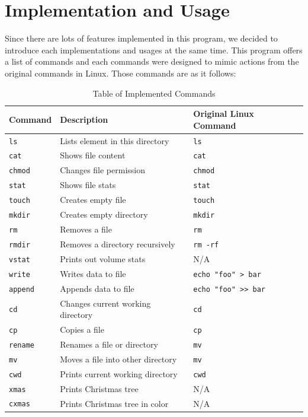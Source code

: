 \documentclass{homework}
\begin{document}
\section{Implementation and Usage}
Since there are lots of features implemented in this program, we decided to introduce each implementations and usages at the same time. This program offers a list of commands and each commands were designed to mimic actions from the original commands in Linux. Those commands are as it follows:

\begin{center}
\begin{table}[h]
\begin{tabularx}{1.0\textwidth} { 
  | >{\centering\arraybackslash}X 
  | >{\centering\arraybackslash}X 
  | >{\centering\arraybackslash}X | }
 \hline
 \textbf{Command} & \textbf{Description} & \textbf{Original Linux Command}\\
 \hline
 \texttt{ls} & Lists element in this directory & \texttt{ls}\\
  \hline
 \texttt{cat} & Shows file content & \texttt{cat}\\
  \hline
 \texttt{chmod} & Changes file permission & \texttt{chmod}\\
  \hline
 \texttt{stat} & Shows file stats & \texttt{stat}\\
  \hline
 \texttt{touch} & Creates empty file & \texttt{touch}\\
  \hline
 \texttt{mkdir} & Creates empty directory & \texttt{mkdir}\\
   \hline
 \texttt{rm} & Removes a file & \texttt{rm}\\
    \hline
 \texttt{rmdir} & Removes a directory recursively & \texttt{rm -rf}\\
    \hline
 \texttt{vstat} & Prints out volume stats & N/A\\
    \hline
 \texttt{write} & Writes data to file & \texttt{echo "foo" > bar}\\
    \hline
 \texttt{append} & Appends data to file & \texttt{echo "foo" >> bar}\\
    \hline
 \texttt{cd} & Changes current working directory & \texttt{cd}\\
    \hline
 \texttt{cp} & Copies a file & \texttt{cp}\\
    \hline
 \texttt{rename} & Renames a file or directory & \texttt{mv}\\
    \hline
 \texttt{mv} & Moves a file into other directory & \texttt{mv}\\
    \hline
 \texttt{cwd} & Prints current working directory & \texttt{cwd}\\
    \hline
 \texttt{xmas} & Prints Christmas tree & N/A \\
    \hline
 \texttt{cxmas} & Prints Christmas tree in color & N/A \\
    \hline
\end{tabularx}
\caption{Table of Implemented Commands}
\end{table}
\end{center}
\end{document}
